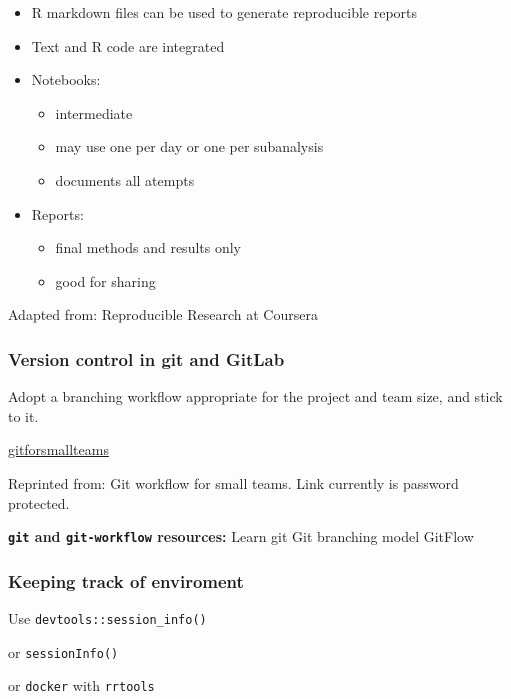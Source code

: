 \documentclass[openany]{article}
\providecommand{\tightlist}{%
  \setlength{\itemsep}{0pt}\setlength{\parskip}{0pt}}
\begin{document}
\begin{itemize}
\item
  R markdown files can be used to generate reproducible reports
\item
  Text and R code are integrated
\item
  Notebooks:

  \begin{itemize}
  \tightlist
  \item
    intermediate
  \item
    may use one per day or one per subanalysis
  \item
    documents all atempts
  \end{itemize}
\item
  Reports:

  \begin{itemize}
  \tightlist
  \item
    final methods and results only
  \item
    good for sharing
  \end{itemize}
\end{itemize}

Adapted from: Reproducible Research at Coursera

\hypertarget{version-control-in-git-and-gitlab}{%
\subsubsection{Version control in git and GitLab}\label{version-control-in-git-and-gitlab}}

Adopt a branching workflow appropriate for the project and team size, and stick to it.

\url{gitforsmallteams}

Reprinted from: Git workflow for small teams. Link currently is password protected.

\textbf{\texttt{git} and \texttt{git-workflow} resources:}
Learn git
Git branching model
GitFlow

\hypertarget{keeping-track-of-enviroment}{%
\subsubsection{Keeping track of enviroment}\label{keeping-track-of-enviroment}}

Use \texttt{devtools::session\_info()}

or \texttt{sessionInfo()}

or \texttt{docker} with \texttt{rrtools}
\end{document}
